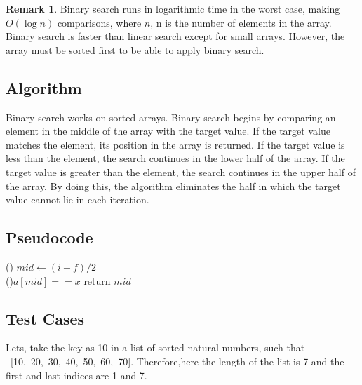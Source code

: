 \documentclass[a4paper,12pt]{article}
\theoremstyle{definition}
\newtheorem{remark}{Remark}
\begin{document}
    \begin{remark}
        Binary search runs in logarithmic time in the worst case, making $O(\log n)$ comparisons, where $n$, n is the
        number of elements in the array.
        Binary search is faster than linear search except for small arrays.
        However, the array must be sorted first to be able to apply binary search.
    \end{remark}

    \subsection*{Algorithm}

    Binary search works on sorted arrays.
    Binary search begins by comparing an element in the middle of the array with the target value.
    If the target value matches the element, its position in the array is returned.
    If the target value is less than the element, the search continues in the lower half of the array.
    If the target value is greater than the element, the search continues in the upper half of the array.
    By doing this, the algorithm eliminates the half in which the target value cannot lie in each iteration.

    \subsection*{Pseudocode}

    \begin{algorithm}[H]
        \Fn(){}{
            $mid \leftarrow (i + f) / 2$\\
            \If(){$a[mid] == x$}{
                return $mid$
            }
        }
    \end{algorithm}

    \subsection*{Test Cases}
    Lets, take the key as 10 in a list of sorted natural numbers, such that ~[10,~20,~30,~40,~50,~60,~70].
    Therefore,here the length of the list is 7 and the first and last indices are 1 and 7.
\end{document}
